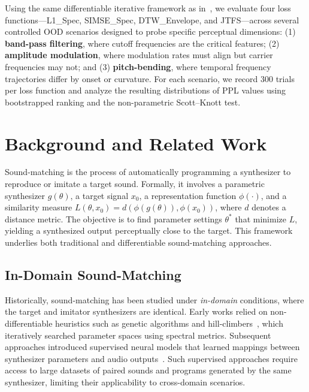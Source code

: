 \documentclass[runningheads]{llncs}
\begin{document}
Using the same differentiable iterative framework as in~\cite{salimi2025soundmatching}, we evaluate four loss functions—L1\_Spec, SIMSE\_Spec, DTW\_Envelope, and JTFS—across several controlled OOD scenarios designed to probe specific perceptual dimensions: (1) \textbf{band-pass filtering}, where cutoff frequencies are the critical features; (2) \textbf{amplitude modulation}, where modulation rates must align but carrier frequencies may not; and (3) \textbf{pitch-bending}, where temporal frequency trajectories differ by onset or curvature.  
For each scenario, we record 300 trials per loss function and analyze the resulting distributions of PPL values using bootstrapped ranking and the non-parametric Scott–Knott test.


\section{Background and Related Work}
\label{sec:background}

Sound-matching is the process of automatically programming a synthesizer to reproduce or imitate a target sound.  
Formally, it involves a parametric synthesizer $g(\theta)$, a target signal $x_0$, a representation function $\phi(\cdot)$, and a similarity measure $L(\theta, x_0) = d(\phi(g(\theta)), \phi(x_0))$, where $d$ denotes a distance metric.  
The objective is to find parameter settings $\theta^*$ that minimize $L$, yielding a synthesized output perceptually close to the target.  
This framework underlies both traditional and differentiable sound-matching approaches.

\subsection{In-Domain Sound-Matching}
Historically, sound-matching has been studied under \emph{in-domain} conditions, where the target and imitator synthesizers are identical.  
Early works relied on non-differentiable heuristics such as genetic algorithms and hill-climbers~\cite{horner1993machine,mitchell2007evolutionary}, which iteratively searched parameter spaces using spectral metrics.  
Subsequent approaches introduced supervised neural models that learned mappings between synthesizer parameters and audio outputs~\cite{yee2018automatic,esling2019flow,masuda2021soundmatch}. Such supervised approaches require access to large datasets of paired sounds and programs generated by the same synthesizer, limiting their applicability to cross-domain scenarios.
\end{document}
